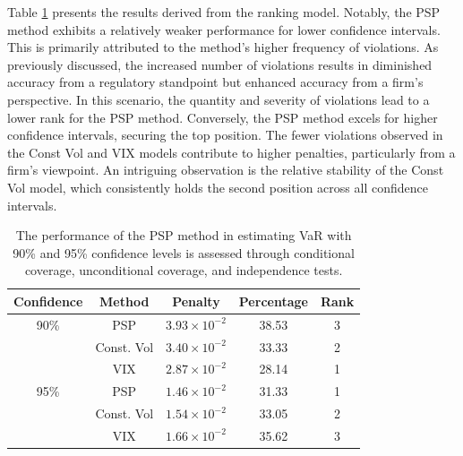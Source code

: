 Table \ref{tab:results_ranks} presents the results derived from the ranking model. Notably, the PSP method exhibits a relatively weaker performance for lower confidence intervals. This is primarily attributed to the method's higher frequency of violations. As previously discussed, the increased number of violations results in diminished accuracy from a regulatory standpoint but enhanced accuracy from a firm's perspective. In this scenario, the quantity and severity of violations lead to a lower rank for the PSP method. Conversely, the PSP method excels for higher confidence intervals, securing the top position. The fewer violations observed in the Const Vol and VIX models contribute to higher penalties, particularly from a firm's viewpoint. An intriguing observation is the relative stability of the Const Vol model, which consistently holds the second position across all confidence intervals.

\begin{table}
\begin{center}
\begin{tabular}{*5c}
\hline 
\hline
\toprule
Confidence&   Method   & Penalty & Percentage & Rank \\
\hline
90\%      & PSP        & $3.93 \times 10^{-2}$      &   38.53  & 3    \\
          & Const. Vol & $3.40 \times 10^{-2}$      &   33.33  & 2    \\
          & VIX        & $2.87 \times 10^{-2}$      &   28.14  & 1    \\
\hline
95\%      & PSP        & $1.46 \times 10^{-2}$      &   31.33  & 1    \\
          & Const. Vol & $1.54 \times 10^{-2}$      &   33.05  & 2    \\
          & VIX        & $1.66 \times 10^{-2}$      &   35.62  & 3    \\
\bottomrule
\hline
\hline
\end{tabular}
\caption{The performance of the PSP method in estimating VaR with 90\% and 95\% confidence levels is assessed through conditional coverage, unconditional coverage, and independence tests.}
\label{tab:results_ranks}
\end{center}
\end{table}

